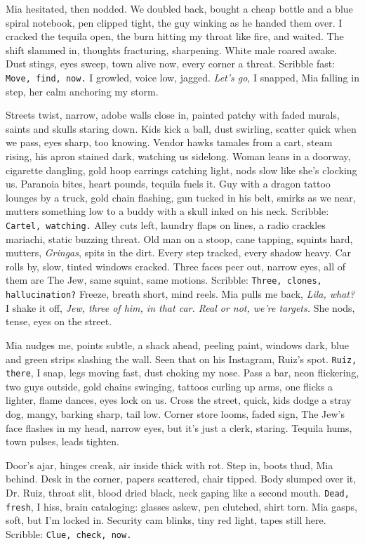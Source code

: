 \documentclass[12pt,oneside]{book} %
\newcommand{\note}[1]{\texttt{#1}}
\begin{document}
Mia hesitated, then nodded. We doubled back, bought a cheap bottle and a blue spiral notebook, pen clipped tight, the guy winking as he handed them over. I cracked the tequila open, the burn hitting my throat like fire, and waited. The shift slammed in, thoughts fracturing, sharpening. White male roared awake. Dust stings, eyes sweep, town alive now, every corner a threat. Scribble fast: \note{Move, find, now.} I growled, voice low, jagged. \textit{Let’s go}, I snapped, Mia falling in step, her calm anchoring my storm.

Streets twist, narrow, adobe walls close in, painted patchy with faded murals, saints and skulls staring down. Kids kick a ball, dust swirling, scatter quick when we pass, eyes sharp, too knowing. Vendor hawks tamales from a cart, steam rising, his apron stained dark, watching us sidelong. Woman leans in a doorway, cigarette dangling, gold hoop earrings catching light, nods slow like she’s clocking us. Paranoia bites, heart pounds, tequila fuels it. Guy with a dragon tattoo lounges by a truck, gold chain flashing, gun tucked in his belt, smirks as we near, mutters something low to a buddy with a skull inked on his neck. Scribble: \note{Cartel, watching.} Alley cuts left, laundry flaps on lines, a radio crackles mariachi, static buzzing threat. Old man on a stoop, cane tapping, squints hard, mutters, \textit{Gringas}, spits in the dirt. Every step tracked, every shadow heavy. Car rolls by, slow, tinted windows cracked. Three faces peer out, narrow eyes, all of them are The Jew, same squint, same motions. Scribble: \note{Three, clones, hallucination?} Freeze, breath short, mind reels. Mia pulls me back, \textit{Lila, what?} I shake it off, \textit{Jew, three of him, in that car. Real or not, we’re targets.} She nods, tense, eyes on the street. 

Mia nudges me, points subtle, a shack ahead, peeling paint, windows dark, blue and green strips slashing the wall. Seen that on his Instagram, Ruiz’s spot. \note{Ruiz, there}, I snap, legs moving fast, dust choking my nose. Pass a bar, neon flickering, two guys outside, gold chains swinging, tattoos curling up arms, one flicks a lighter, flame dances, eyes lock on us. Cross the street, quick, kids dodge a stray dog, mangy, barking sharp, tail low. Corner store looms, faded sign, The Jew’s face flashes in my head, narrow eyes, but it’s just a clerk, staring. Tequila hums, town pulses, leads tighten.

Door’s ajar, hinges creak, air inside thick with rot. Step in, boots thud, Mia behind. Desk in the corner, papers scattered, chair tipped. Body slumped over it, Dr. Ruiz, throat slit, blood dried black, neck gaping like a second mouth. \note{Dead, fresh}, I hiss, brain cataloging: glasses askew, pen clutched, shirt torn. Mia gasps, soft, but I’m locked in. Security cam blinks, tiny red light, tapes still here. Scribble: \note{Clue, check, now.}
\end{document}
